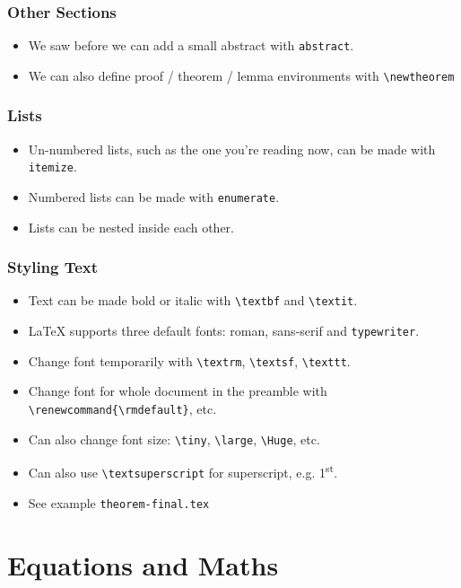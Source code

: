 \documentclass{beamer}
\begin{document}
\begin{frame}
	\frametitle{Other Sections}
	\begin{itemize}
		\item We saw before we can add a small abstract with \texttt{abstract}.
		\item We can also define proof / theorem / lemma environments with \texttt{\textbackslash{}newtheorem}
	\end{itemize}
\end{frame}

\begin{frame}
	\frametitle{Lists}
	\begin{itemize}
		\item Un-numbered lists, such as the one you're reading now, can be made with \texttt{itemize}.
		\item Numbered lists can be made with \texttt{enumerate}.
		\item Lists can be nested inside each other.
	\end{itemize}
\end{frame}

\begin{frame}
	\frametitle{Styling Text}
	\begin{itemize}
		\item Text can be made bold or italic with \texttt{\textbackslash{}textbf} and \texttt{\textbackslash{}textit}.
		\item \LaTeX{} supports three default fonts: \textrm{roman}, sans-serif and \texttt{typewriter}.
		\item Change font temporarily with \texttt{\textbackslash{}textrm}, \texttt{\textbackslash{}textsf}, \texttt{\textbackslash{}texttt}.
		\item Change font for whole document in the preamble with \texttt{\textbackslash{}renewcommand\{\textbackslash{}rmdefault\}}, etc.
		\item Can also change font size: \texttt{\textbackslash{}tiny}, \texttt{\textbackslash{}large}, \texttt{\textbackslash{}Huge}, etc.
		\item Can also use \texttt{\textbackslash{}textsuperscript} for superscript, e.g. 1\textsuperscript{st}.
		\item See example \texttt{theorem-final.tex}
	\end{itemize}
\end{frame}

\section{Equations and Maths}
\end{document}
